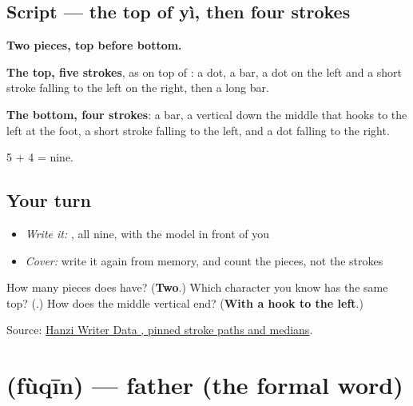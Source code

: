 \subsection*{Script — the top of yì, then four strokes}

\begin{quote}
\end{quote}

\textbf{Two pieces, top before bottom.}

\textbf{The top, five strokes}, as on top of : a dot, a bar, a dot on the left and a short stroke falling to the left on the right, then a long bar.

\textbf{The bottom, four strokes}: a bar, a vertical down the middle that hooks to the left at the foot, a short stroke falling to the left, and a dot falling to the right.

5 + 4 = nine.

\subsection*{Your turn}
\begin{itemize}
\raggedright
  \item \emph{Write it:} , all nine, with the model in front of you
  \item \emph{Cover:} write it again from memory, and count the pieces, not the strokes
\end{itemize}

\begin{tcolorbox}[breakable,colback=teal!4,colframe=teal!35!black,title={Before you move on}]
How many pieces does  have? (\textbf{Two}.) Which character you know has the same top? (\textbf{}.) How does the middle vertical end? (\textbf{With a hook to the left}.)

Source: \href{https://raw.githubusercontent.com/chanind/hanzi-writer-data/68d10a4b21150cae5e1ebbd223eed289cf32d90c/data/\%E4\%BA\%B2.json}{Hanzi Writer Data , pinned stroke paths and medians}.
\end{tcolorbox}
\section[\texorpdfstring{\zh{父亲} (fùqīn)}{父亲 (fùqīn)}]{ (fùqīn) — father (the formal word)}

\label{lesson:ZH-C511-fuqin}



